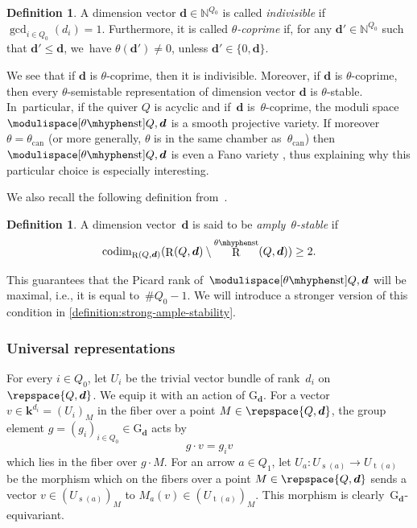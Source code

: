 \documentclass[JEP,XML,SOM,Unicode,NoEqCountersInSection,published]{cedram}
\theoremstyle{plain}
\theoremstyle{definition}
\newtheorem{definition}[theorem]{Definition}
\DeclareMathOperator\Rep{R}
\DeclareMathOperator\source{s}
\DeclareMathOperator\target{t}
\newcommand\can{\ensuremath{\mathrm{can}}}
\newcommand\dash{\nobreakdash-\hspace{0pt}}
\newcommand\field{\mathbf{k}}
\newcommand\group[1][\tuple{d}]{\mathrm{G}_{#1}}
\newcommand\stable{\ensuremath{\mhyphen\mathrm{st}}}
\newcommand\tuple[1]{\ensuremath{{\boldsymbol{#1}}}}
\begin{document}
\begin{definition}
A dimension vector $\tuple{d} \in \mathbb{N}^{Q_0}$ is called \emph{indivisible}
if $\gcd_{i \in Q_0}(d_i) = 1$.
Furthermore, it is called \emph{$\theta$-coprime} if,
for any $\tuple{d'} \in \mathbb{N}^{Q_0}$ such that $\tuple{d'} \leq \tuple{d}$, we~have $\theta(\tuple{d'}) \neq 0$,
unless $\tuple{d'} \in \{0,\tuple{d}\}$.
\end{definition}
We see that if $\tuple{d}$ is $\theta$-coprime, then it is indivisible.
Moreover, if $\tuple{d}$ is $\theta$-coprime,
then every $\theta$-semistable representation of dimension vector $\tuple{d}$ is $\theta$-stable. In~particular, if the quiver $Q$ is acyclic and if~$\tuple{d}$ is~$\theta$\dash coprime,
the moduli space~$\modulispace[\theta\stable]{Q,\tuple{d}}$ is a smooth projective variety.
If moreover~$\theta=\theta_\can$ (or more generally, $\theta$ is in the same chamber as~$\theta_\can$)
then~$\modulispace[\theta\stable]{Q,\tuple{d}}$ is even a Fano variety \cite{MR4352662},
thus explaining why this particular choice is especially interesting.

We also recall the following definition from~\cite[Def.\,4.1]{MR3683503}.
\begin{definition}
\label{definition:ample-stability}
A dimension vector~$\tuple{d}$ is said to be \emph{amply~$\theta$-stable} if
\begin{equation*}
\operatorname{codim}_{\Rep(Q,\tuple{d})}(\Rep(Q,\tuple{d})\setminus\Rep^{\theta\stable}(Q,\tuple{d}))\geq 2.
\end{equation*}
\end{definition}
This guarantees that the Picard rank of~$\modulispace[\theta\stable]{Q,\tuple{d}}$ will be maximal,
i.e., it is equal to~$\#Q_0-1$.
We will introduce a stronger version of this condition in \cref{definition:strong-ample-stability}.

\subsubsection*{Universal representations}
For every $i \in Q_0$,
let $U_i$ be the trivial vector bundle of rank~$d_i$ on $\repspace{Q,\tuple{d}}$.
We equip it with an action of $\group$.
For a vector $v \in \field^{d_i} = (U_i)_M$ in the fiber over a point $M \in \repspace{Q,\tuple{d}}$,
the group element $g=(g_i)_{i\in Q_0} \in \group$ acts by
\begin{equation*}
g \cdot v = g_iv
\end{equation*}
which lies in the fiber over $g\cdot M$.
For an arrow $a \in Q_1$,
let $U_a\colon U_{\source(a)} \to U_{\target(a)}$ be
the morphism which on the fibers over a point $M \in \repspace{Q,\tuple{d}}$
sends a vector $v \in (U_{\source(a)})_M$ to $M_a(v) \in (U_{\target(a)})_M$.
This morphism is clearly~$\group$\dash equivariant.
\end{document}
